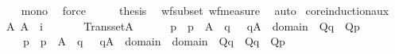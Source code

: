 \begin{isabellebody}
\ \ \ \ \isamarkupfalse%
\ {\isasymGamma}{\isacharunderscore}{\kern0pt}mono\ \isamarkupfalse%
\ force\isanewline
\ \ \isamarkupfalse%
\ \isamarkupfalse%
\ {\isacharquery}{\kern0pt}thesis\ \isamarkupfalse%
\ wf{\isacharunderscore}{\kern0pt}subset\ wf{\isacharunderscore}{\kern0pt}measure\ \isamarkupfalse%
\ auto\isanewline
{}\isamarkupfalse%
%
\endisatagproof
{\isafoldproof}%
%
\isadelimproof
\isanewline
%
\endisadelimproof
\isanewline
{}\isamarkupfalse%
\ core{\isacharunderscore}{\kern0pt}induction{\isacharunderscore}{\kern0pt}aux{\isacharcolon}{\kern0pt}\isanewline
\ \ \ A{}\ A{}\ {\isacharcolon}{\kern0pt}{\isacharcolon}{\kern0pt}\ {\isachardoublequoteopen}i{\isachardoublequoteclose}\isanewline
\ \ \isanewline
\ \ \ \ {\isachardoublequoteopen}Transset{\isacharparenleft}{\kern0pt}A{}{\isacharparenright}{\kern0pt}{\isachardoublequoteclose}\isanewline
\ \ \ \ {\isachardoublequoteopen}{\isasymAnd}{\isasymtau}\ {\isasymtheta}\ p{\isachardot}{\kern0pt}\ \ p\ {\isasymin}\ A{}\ {\isasymLongrightarrow}\ {\isasymlbrakk}{\isasymAnd}q\ {\isasymsigma}{\isachardot}{\kern0pt}\ {\isasymlbrakk}\ q{\isasymin}A{}\ {\isacharsemicolon}{\kern0pt}\ {\isasymsigma}{\isasymin}domain{\isacharparenleft}{\kern0pt}{\isasymtheta}{\isacharparenright}{\kern0pt}{\isasymrbrakk}\ {\isasymLongrightarrow}\ Q{\isacharparenleft}{\kern0pt}{}{\isacharcomma}{\kern0pt}{\isasymtau}{\isacharcomma}{\kern0pt}{\isasymsigma}{\isacharcomma}{\kern0pt}q{\isacharparenright}{\kern0pt}{\isasymrbrakk}\ {\isasymLongrightarrow}\ Q{\isacharparenleft}{\kern0pt}{}{\isacharcomma}{\kern0pt}{\isasymtau}{\isacharcomma}{\kern0pt}{\isasymtheta}{\isacharcomma}{\kern0pt}p{\isacharparenright}{\kern0pt}{\isachardoublequoteclose}\isanewline
\ \ \ \ {\isachardoublequoteopen}{\isasymAnd}{\isasymtau}\ {\isasymtheta}\ p{\isachardot}{\kern0pt}\ \ p\ {\isasymin}\ A{}\ {\isasymLongrightarrow}\ {\isasymlbrakk}{\isasymAnd}q\ {\isasymsigma}{\isachardot}{\kern0pt}\ {\isasymlbrakk}\ q{\isasymin}A{}\ {\isacharsemicolon}{\kern0pt}\ {\isasymsigma}{\isasymin}domain{\isacharparenleft}{\kern0pt}{\isasymtau}{\isacharparenright}{\kern0pt}\ {\isasymunion}\ domain{\isacharparenleft}{\kern0pt}{\isasymtheta}{\isacharparenright}{\kern0pt}{\isasymrbrakk}\ {\isasymLongrightarrow}\ Q{\isacharparenleft}{\kern0pt}{}{\isacharcomma}{\kern0pt}{\isasymsigma}{\isacharcomma}{\kern0pt}{\isasymtau}{\isacharcomma}{\kern0pt}q{\isacharparenright}{\kern0pt}\ {\isasymand}\ Q{\isacharparenleft}{\kern0pt}{}{\isacharcomma}{\kern0pt}{\isasymsigma}{\isacharcomma}{\kern0pt}{\isasymtheta}{\isacharcomma}{\kern0pt}q{\isacharparenright}{\kern0pt}{\isasymrbrakk}\ {\isasymLongrightarrow}\ Q{\isacharparenleft}{\kern0pt}{}{\isacharcomma}{\kern0pt}{\isasymtau}{\isacharcomma}{\kern0pt}{\isasymtheta}{\isacharcomma}{\kern0pt}p{\isacharparenright}{\kern0pt}{\isachardoublequoteclose}\isanewline

\end{isabellebody}
